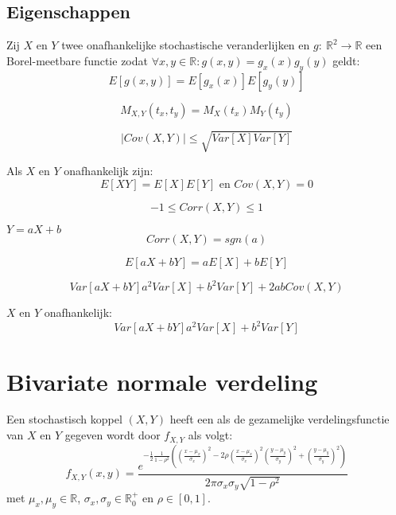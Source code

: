 \documentclass[main.tex]{subfiles}
\begin{document}
\subsection{Eigenschappen}
\label{sec:eigenschappen}

\begin{st}
  Zij $X$ en $Y$ twee onafhankelijke stochastische veranderlijken en $g:\ \mathbb{R}^{2} \rightarrow \mathbb{R}$ een Borel-meetbare functie zodat $\forall x,y\in \mathbb{R}: g(x,y) =g_{x}(x)g_{y}(y)$ geldt:
  \[ E[g(x,y)] = E[g_{x}(x)]E[g_{y}(y)] \]
\end{st}

\begin{gev}
  \[ M_{X,Y}(t_{x},t_{y}) = M_{X}(t_{x}) M_{Y}(t_{y}) \]
\end{gev}

\begin{st}
  \[ |Cov(X,Y)| \le \sqrt{Var[X]Var[Y]} \]
\end{st}

\begin{st}
  Als $X$ en $Y$ onafhankelijk zijn:
  \[ E[XY] = E[X]E[Y] \text{ en } Cov(X,Y) = 0 \]
\end{st}

\begin{gev}
  \[ -1 \le Corr(X,Y) \le 1 \]
\end{gev}

\begin{gev}
  $Y = aX+b$
  \[ Corr(X,Y) = sgn(a) \]
\end{gev}

\begin{st}
  \[ E[aX + bY] = aE[X] + bE[Y] \]
\end{st}

\begin{st}
  \[ Var[aX+bY]  a^{2}Var[X] + b^{2}Var[Y] + 2abCov(X,Y) \]
\end{st}

\begin{gev}
  $X$ en $Y$ onafhankelijk:
  \[ Var[aX+bY]  a^{2}Var[X] + b^{2}Var[Y]\]
\end{gev}

\section{Bivariate normale verdeling}
\label{sec:bivar-norm-verd}

\begin{de}
  Een stochastisch koppel $(X,Y)$ heeft een  als de gezamelijke verdelingsfunctie van $X$ en $Y$ gegeven wordt door $f_{X,Y}$ als volgt:
  \[
  f_{X,Y}(x,y)
  =
  \frac
  {
    e^{-\frac{1}{2}\frac{1}{1-\rho^{2}}
      \left(
          \left(\frac{x-\mu_{x}}{\sigma_{x}}\right)^{2}
        - 2\rho\left(\frac{x-\mu_{x}}{\sigma_{x}}\right)^{2}\left(\frac{y-\mu_{y}}{\sigma_{y}}\right)^{2}
        + \left(\frac{y-\mu_{y}}{\sigma_{y}}\right)^{2}
      \right)
      }
  }
  {
    2\pi\sigma_{x}\sigma_{y}\sqrt{1-\rho^{2}}
  }
  \]
  met $\mu_{x},\mu_{y}\in \mathbb{R}$, $\sigma_{x},\sigma_{y}\in \mathbb{R}_{0}^{+}$ en $\rho \in [0,1]$.
\end{de}
\end{document}
